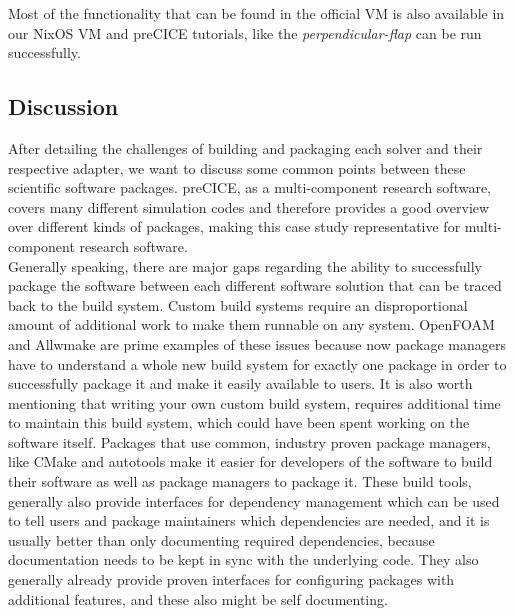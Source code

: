 \documentclass[conference,final,a4paper]{IEEEtran}
\begin{document}
Most of the functionality that can be found in the official VM is also available in our NixOS VM and preCICE tutorials, like the \textit{perpendicular-flap} can be run successfully.

\subsection{Discussion}

After detailing the challenges of building and packaging each solver and their respective adapter, we want to discuss some common points between these scientific software packages.
preCICE, as a multi-component research software, covers many different simulation codes and therefore provides a good overview over different kinds of packages, making this case study representative for multi-component research software.\\

Generally speaking, there are major gaps regarding the ability to successfully package the software between each different software solution that can be traced back to the build system.
Custom build systems require an disproportional amount of additional work to make them runnable on any system.
OpenFOAM and Allwmake are prime examples of these issues because now package managers have to understand a whole new build system for exactly one package in order to successfully package it and make it easily available to users.
It is also worth mentioning that writing your own custom build system, requires additional time to maintain this build system, which could have been spent working on the software itself.
Packages that use common, industry proven package managers, like CMake and autotools make it easier for developers of the software to build their software as well as package managers to package it.
These build tools, generally also provide interfaces for dependency management which can be used to tell users and package maintainers which dependencies are needed, and it is usually better than only documenting required dependencies, because documentation needs to be kept in sync with the underlying code.
They also generally already provide proven interfaces for configuring packages with additional features, and these also might be self documenting.
\end{document}
